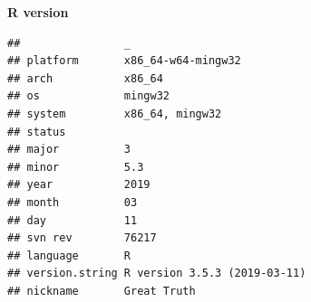 \documentclass[
]{article}
\begin{document}
\textbf{R version}

\begin{verbatim}
##                _                           
## platform       x86_64-w64-mingw32          
## arch           x86_64                      
## os             mingw32                     
## system         x86_64, mingw32             
## status                                     
## major          3                           
## minor          5.3                         
## year           2019                        
## month          03                          
## day            11                          
## svn rev        76217                       
## language       R                           
## version.string R version 3.5.3 (2019-03-11)
## nickname       Great Truth
\end{verbatim}
\end{document}
